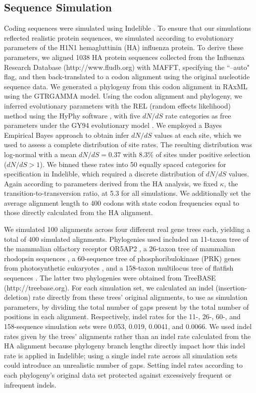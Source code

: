 \documentclass[11pt]{article}
\begin{document}
\subsection*{Sequence Simulation}
Coding sequences were simulated using Indelible \citep{Fletcher2009}. To ensure that our simulations reflected realistic protein sequences, we simulated according to evolutionary parameters of the H1N1 hemagluttinin (HA) influenza protein. To derive these parameters, we aligned 1038 HA protein sequences collected from the Influenza Research Database (http://www.fludb.org) with MAFFT, specifying the ``--auto" flag, \citep{Katoh2002,Katoh2005} and then back-translated to a codon alignment using the original nucleotide sequence data. We generated a phylogeny from this codon alignment in RAxML \citep{Stamatakis2006} using the GTRGAMMA model. Using the codon alignment and phylogeny, we inferred evolutionary parameters with the REL (random effects likelihood)  method \citep{NielsenYang1998} using the HyPhy software \citep{Pond2005}, with five $dN/dS$ rate categories as free parameters under the GY94 evolutionary model \citep{GoldmanYang1994}. We employed a Bayes Empirical Bayes approach \citep{Yang2000} to obtain infer $dN/dS$ values at each site, which we used to assess a complete distribution of site rates. The resulting distribution was log-normal with a mean $dN/dS = 0.37$ with 8.3\% of sites  under positive selection ($dN/dS>1$). We binned these rates into 50 equally spaced categories for specification in Indelible, which required a discrete distribution of $dN/dS$ values. Again according to parameters derived from the HA analysis, we fixed $\kappa$, the transition-to-transversion ratio, at 5.3 for all simulations. We additionally set the average alignment length to 400 codons with state codon frequencies equal to those directly calculated from the HA alignment.

We simulated 100 alignments across four different real gene trees each, yielding a total of 400 simulated alignments. Phylogenies used included an 11-taxon tree of the mammalian olfactory receptor OR5AP2 \citep{Spielman2013}, a 26-taxon tree of mammalian rhodopsin sequences \citep{Spielman2013}, a 60-sequence tree of phosphoribulokinase (PRK) genes from photosynthetic eukaryotes \citep{Yang2011}, and a 158-taxon multilocus tree of flatfish sequences \citep{Betancur2013}. The latter two phylogenies were obtained from TreeBASE (http://treebase.org).
For each simulation set, we calculated an indel (insertion-deletion) rate directly from these trees' original alignments, to use as simulation parameters, by dividing the total number of gaps present by the total number of positions in each alignment. Respectively, indel rates for the 11-, 26-, 60-, and 158-sequence simulation sets were 0.053, 0.019, 0.0041, and 0.0066. We used indel rates given by the trees' alignments rather than an indel rate calculated from the HA alignment because phylogeny branch lengths directly impact how this indel rate is applied in Indelible; using a single indel rate across all simulation sets could introduce an unrealistic number of gaps. Setting indel rates according to each phylogeny's original data set protected against excessively frequent or infrequent indels.
\end{document}

